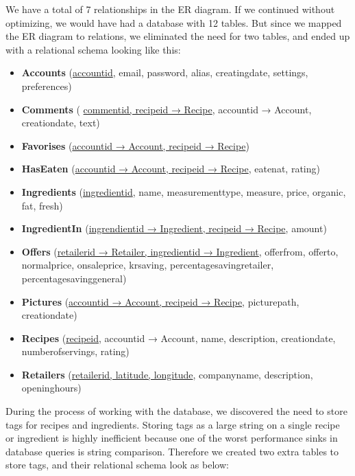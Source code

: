We have a total of 7 relationships in the ER diagram. If we continued without optimizing, we would have had a database with 12 tables. But since we mapped the ER diagram to relations, we eliminated the need for two tables, and ended up with a relational schema looking like this:

\begin{itemize}
\item \textbf{Accounts} (\underline{accountid}, email, password, alias, creatingdate, settings, preferences)
%
\item \textbf{Comments} ( \underline{commentid, recipeid → Recipe}, accountid → Account, creationdate, text)

\item \textbf{Favorises} (\underline{accountid → Account, recipeid → Recipe})

\item \textbf{HasEaten} (\underline{accountid → Account, recipeid → Recipe}, eatenat, rating)

\item \textbf{Ingredients} (\underline{ingredientid}, name, measurementtype, measure, price, organic, fat, fresh)

\item \textbf{IngredientIn} (\underline{ingrendientid → Ingredient, recipeid → Recipe}, amount)

\item \textbf{Offers} (\underline{retailerid → Retailer, ingredientid → Ingredient}, offerfrom, offerto, normalprice, onsaleprice, krsaving, percentagesavingretailer, percentagesavinggeneral)

\item \textbf{Pictures} (\underline{accountid → Account, recipeid → Recipe}, picturepath, creationdate)

\item \textbf{Recipes} (\underline{recipeid}, accountid → Account, name, description, creationdate, numberofservings, rating)

\item \textbf{Retailers} (\underline{retailerid, latitude, longitude}, companyname, description, openinghours)
\end{itemize}

During the process of working with the database, we discovered the need to store tags for recipes and ingredients. Storing tags as a large string on a single recipe or ingredient is highly inefficient because one of the worst performance sinks in database queries is string comparison. Therefore we created two extra tables to store tags, and their relational schema look as below:

